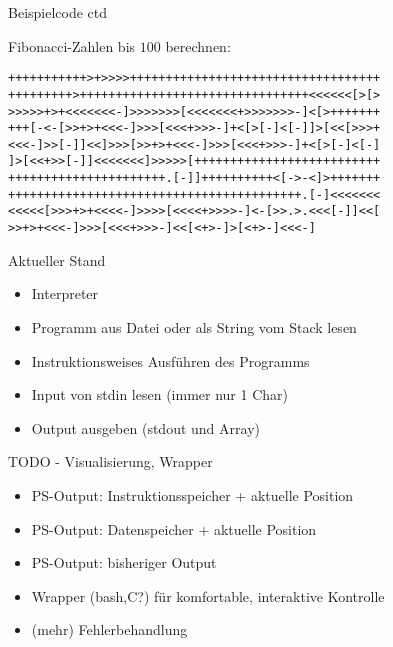 \documentclass{beamer}
\begin{document}
\begin{frame}[fragile,c]{Beispielcode ctd}

    Fibonacci-Zahlen bis $100$ berechnen:

    \begin{verbatim}
+++++++++++>+>>>>+++++++++++++++++++++++++++++++++++
+++++++++>++++++++++++++++++++++++++++++++<<<<<<[>[>
>>>>>+>+<<<<<<<-]>>>>>>>[<<<<<<<+>>>>>>>-]<[>+++++++
+++[-<-[>>+>+<<<-]>>>[<<<+>>>-]+<[>[-]<[-]]>[<<[>>>+
<<<-]>>[-]]<<]>>>[>>+>+<<<-]>>>[<<<+>>>-]+<[>[-]<[-]
]>[<<+>>[-]]<<<<<<<]>>>>>[++++++++++++++++++++++++++
++++++++++++++++++++++.[-]]++++++++++<[->-<]>+++++++
+++++++++++++++++++++++++++++++++++++++++.[-]<<<<<<<
<<<<<[>>>+>+<<<<-]>>>>[<<<<+>>>>-]<-[>>.>.<<<[-]]<<[
>>+>+<<<-]>>>[<<<+>>>-]<<[<+>-]>[<+>-]<<<-]
    \end{verbatim}

\end{frame}

\begin{frame}{Aktueller Stand}

    \begin{itemize}
        \item Interpreter
        \item Programm aus Datei oder als String vom Stack lesen
        \item Instruktionsweises Ausführen des Programms
        \item Input von stdin lesen (immer nur 1 Char)
        \item Output ausgeben (stdout und Array)
    \end{itemize}

\end{frame}

\begin{frame}{TODO - Visualisierung, Wrapper}

    \begin{itemize}
        \item PS-Output: Instruktionsspeicher + aktuelle Position
        \item PS-Output: Datenspeicher + aktuelle Position
        \item PS-Output: bisheriger Output
        \item Wrapper (bash,C?) für komfortable, interaktive Kontrolle
        \item (mehr) Fehlerbehandlung
    \end{itemize}

\end{frame}
\end{document}
